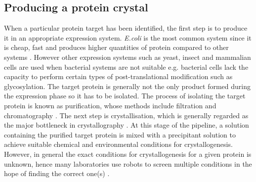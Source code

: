     \subsection{Producing a protein crystal}
    \label{sub:Producing a protein crystal}
        When a particular protein target has been identified, the first step is to produce it in an appropriate expression system.
        \textit{E.coli} is the most common system since it is cheap, fast and produces higher quantities of protein compared to other systems \cite{rai2001expression}.
        However other expression systems such as yeast, insect and mammalian cells are used when bacterial systems are not suitable e.g. bacterial cells lack the capacity to perform certain types of post-translational modification such as glycosylation.
        The target protein is generally not the only product formed during the expression phase so it has to be isolated.
        The process of isolating the target protein is known as purification, whose methods include filtration and chromatography \cite{graslund2008protein}.
        The next step is crystallisation, which is generally regarded as the major bottleneck in crystallography \cite{garman2014}.
        At this stage of the pipeline, a solution containing the purified target protein is mixed with a precipitant solution to achieve suitable chemical and environmental conditions for crystallogenesis.
        However, in general the exact conditions for crystallogenesis for a given protein is unknown, hence many laboratories use robots to screen multiple conditions in the hope of finding the correct one(s) \cite{luft2007efficient}.

